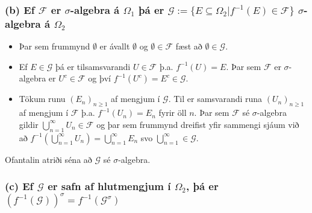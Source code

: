 \documentclass[]{book}
\begin{document}
\hypertarget{b-ef-mathcal-f-er-sigma-algebra-a-omega_1-a-er-mathcal-g-esubseteq-omega_2-f-1ein-mathcal-f-sigma-algebra-a-omega_2}{%
\subsubsection*{\texorpdfstring{(b) Ef \(\mathcal F\) er \(\sigma\)-algebra á \(\Omega_1\) þá er \(\mathcal G := \{E\subseteq \Omega_2 | f^{-1}(E)\in \mathcal F\}\) \(\sigma\)-algebra á \(\Omega_2\)}{(b) Ef \textbackslash{}mathcal F er \textbackslash{}sigma-algebra á \textbackslash{}Omega\_1 þá er \textbackslash{}mathcal G := \textbackslash{}\{E\textbackslash{}subseteq \textbackslash{}Omega\_2 \textbar{} f\^{}\{-1\}(E)\textbackslash{}in \textbackslash{}mathcal F\textbackslash{}\} \textbackslash{}sigma-algebra á \textbackslash{}Omega\_2}}\label{b-ef-mathcal-f-er-sigma-algebra-a-omega_1-a-er-mathcal-g-esubseteq-omega_2-f-1ein-mathcal-f-sigma-algebra-a-omega_2}}

\begin{itemize}
\item
  Þar sem frummynd \(\emptyset\) er ávallt \(\emptyset\) og \(\emptyset\in\mathcal F\) fæst að \(\emptyset \in \mathcal G\).
\item
  Ef \(E \in \mathcal G\) þá er tilsamsvarandi \(U\in \mathcal F\) þ.a. \(f^{-1}(U) = E\). Þar sem \(\mathcal F\) er \(\sigma\)-algebra er \(U^c\in\mathcal F\) og því \(f^{-1}(U^c) = E^c \in \mathcal G\).
\item
  Tökum runu \((E_n)_{n\geq1}\) af mengjum í \(\mathcal G\). Til er samsvarandi runa \((U_n)_{n\geq1}\) af mengjum í \(\mathcal F\) þ.a. \(f^{-1}(U_n) = E_n\) fyrir öll \(n\). Þar sem \(\mathcal F\) sé \(\sigma\)-algebra gildir \(\bigcup_{n=1}^\infty U_n \in \mathcal F\) og þar sem frummynd dreifist yfir sammengi sjáum við að \(f^{-1}(\bigcup_{n=1}^\infty U_n) = \bigcup_{n=1}^\infty E_n\) svo \(\bigcup_{n=1}^\infty\in\mathcal G\).
\end{itemize}

Ofantalin atriði séna að \(\mathcal G\) sé \(\sigma\)-algebra.

\hypertarget{c-ef-mathcal-g-er-safn-af-hlutmengjum-i-omega_2-a-er-f-1mathcal-gsigma-f-1mathcal-gsigma}{%
\subsubsection*{\texorpdfstring{(c) Ef \(\mathcal G\) er safn af hlutmengjum í \(\Omega_2\), þá er \((f^{-1}(\mathcal G))^\sigma = f^{-1}(\mathcal G^\sigma)\)}{(c) Ef \textbackslash{}mathcal G er safn af hlutmengjum í \textbackslash{}Omega\_2, þá er (f\^{}\{-1\}(\textbackslash{}mathcal G))\^{}\textbackslash{}sigma = f\^{}\{-1\}(\textbackslash{}mathcal G\^{}\textbackslash{}sigma)}}\label{c-ef-mathcal-g-er-safn-af-hlutmengjum-i-omega_2-a-er-f-1mathcal-gsigma-f-1mathcal-gsigma}}
\end{document}
